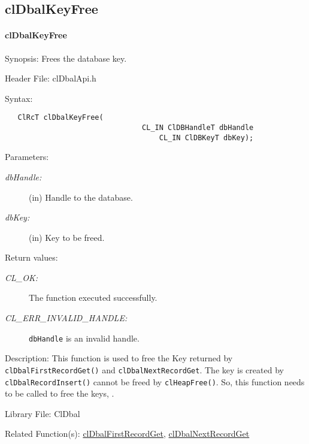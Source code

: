 \begin{flushleft}
\newpage
\subsection{clDbalKeyFree}
\hypertarget{pagedbal115}{}\paragraph{cl\-Dbal\-Key\-Free}\label{pagedbal115}
\begin{Desc}
\item[Synopsis:]Frees the database key.\end{Desc}
\begin{Desc}
\item[Header File:]clDbalApi.h\end{Desc}
\begin{Desc}
\item[Syntax:]

\footnotesize\begin{verbatim}   ClRcT clDbalKeyFree(
                          		CL_IN ClDBHandleT dbHandle
                            		CL_IN ClDBKeyT dbKey);
\end{verbatim}
\normalsize
\end{Desc}
\begin{Desc}
\item[Parameters:]
\begin{description}
\item[{\em db\-Handle:}](in) Handle to the database. \item[{\em db\-Key:}](in) Key to be freed.\end{description}
\end{Desc}
\begin{Desc}
\item[Return values:]
\begin{description}
\item[{\em CL\_\-OK:}]The function executed successfully. 
\item[{\em CL\_\-ERR\_\-INVALID\_\-HANDLE:}]{\tt{dbHandle}} is an invalid handle.\end{description}
\end{Desc}
\begin{Desc}
\item[Description:]This function is used to free the Key returned by {\tt{cl\-Dbal\-First\-Record\-Get()}} and {\tt{cl\-Dbal\-Next\-Record\-Get}}. The 
key is created by {\tt{clDbalRecordInsert()}} cannot be freed by {\tt{cl\-Heap\-Free()}}. So, this function needs to be called to free the keys, .\end{Desc}
\begin{Desc}
\item[Library File:]Cl\-Dbal\end{Desc}
\begin{Desc}
\item[Related Function(s):]\hyperlink{pagedbal109}{cl\-Dbal\-First\-Record\-Get}, \hyperlink{pagedbal110}{cl\-Dbal\-Next\-Record\-Get} \end{Desc}



\end{flushleft}
